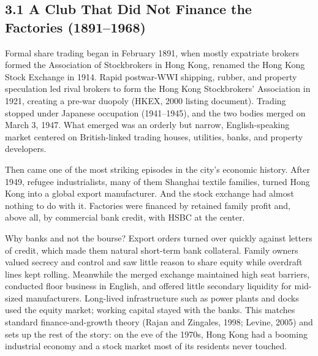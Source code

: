 \documentclass[11pt,letterpaper]{article}
\begin{document}
\subsection*{\texorpdfstring{3.1 A Club That Did Not Finance the Factories (1891–1968)}{3.1 A Club That Did Not Finance the Factories (1891–1968)}}
Formal share trading began in February 1891, when mostly expatriate brokers formed the Association of Stockbrokers in Hong Kong, renamed the Hong Kong Stock Exchange in 1914. Rapid postwar-WWI shipping, rubber, and property speculation led rival brokers to form the Hong Kong Stockbrokers' Association in 1921, creating a pre-war duopoly (HKEX, 2000 listing document). Trading stopped under Japanese occupation (1941–1945), and the two bodies merged on March 3, 1947. What emerged was an orderly but narrow, English-speaking market centered on British-linked trading houses, utilities, banks, and property developers.

Then came one of the most striking episodes in the city's economic history. After 1949, refugee industrialists, many of them Shanghai textile families, turned Hong Kong into a global export manufacturer. And the stock exchange had almost nothing to do with it. Factories were financed by retained family profit and, above all, by commercial bank credit, with HSBC at the center.

Why banks and not the bourse? Export orders turned over quickly against letters of credit, which made them natural short-term bank collateral. Family owners valued secrecy and control and saw little reason to share equity while overdraft lines kept rolling. Meanwhile the merged exchange maintained high seat barriers, conducted floor business in English, and offered little secondary liquidity for mid-sized manufacturers. Long-lived infrastructure such as power plants and docks used the equity market; working capital stayed with the banks. This matches standard finance-and-growth theory (Rajan and Zingales, 1998; Levine, 2005) and sets up the rest of the story: on the eve of the 1970s, Hong Kong had a booming industrial economy and a stock market most of its residents never touched.
\end{document}
